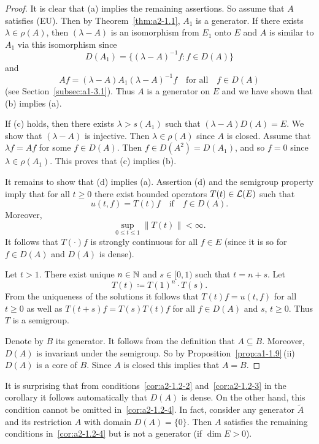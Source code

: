 \begin{proof}
It is clear that (a) implies the remaining assertions.
So assume that $A$ satisfies (EU).
Then by Theorem~\ref{thm:a2-1.1}, $A_{1}$ is a generator.
If there exists $\lambda \in \rho(A)$, then $(\lambda-A)$ is an isomorphism from $E_{1}$ onto $E$ and $A$ is similar to $A_{1}$ via this isomorphism since 
\[
D(A_{1}) = \{(\lambda-A)^{-1}f \colon f \in D(A)\}
\]
and 
%
\[
	Af = (\lambda-A)A_{1}(\lambda-A)^{-1}f
	\quad \text{for all} \quad f \in D(A)
\]
%
(see Section~\ref{subsec:a1-3.1}).
Thus $A$ is a generator on $E$ and we have shown that (b) implies (a).   

If (c)  holds, then there exists $\lambda > s(A_{1})$ such that $(\lambda-A)D(A) = E$.
We show that $(\lambda-A)$ is injective.
Then $\lambda \in \rho(A)$ since $A$ is closed.
Assume that $\lambda f = Af$ for some $f \in D(A)$.
Then $f \in D(A^{2}) = D(A_{1})$, and so $f = 0$ since $\lambda \in \rho(A_{1})$.
This proves that (c) implies (b).  

It remains to show that (d)  implies (a). 
Assertion (d) and the semigroup property imply that for all $ t \geq 0 $ there exist bounded operators $ T(t) \in \mathcal{L}(E) $ such that 
%
\[
	u(t,f) = T(t)f 
	\quad \text{if} \quad 
	f \in D(A) .
\]
%
Moreover, 
%
\[
	\sup_{0 \leq t \leq 1} \|T(t)\| < \infty .
\]
%
It follows that $ T(\cdot)f $ is strongly continuous for all $ f \in E $ (since it is so for $ f \in D(A) $ and $ D(A) $ is dense).

Let $ t > 1 $.
There exist unique $ n \in \mathbb{N} $ and $ s \in [0,1) $ such that $ t = n + s $.
Let 
%
\[
	T(t) \coloneq T(1)^{n} \cdot T(s) .
\]
%
From the uniqueness of the solutions it follows that $ T(t)f = u(t,f) $ for all $ t \geq 0 $ as well as $ T(t+s)f = T(s)T(t)f $ for all $ f \in D(A) $ and $ s$, $t \geq 0 $.
Thus $ T $ is a semigroup.

Denote by $ B $ its generator.
It follows from the definition that $ A \subseteq B $.
Moreover, $ D(A) $ is invariant under the semigroup.
So by Proposition~\ref{prop:a1-1.9}\,(ii) $ D(A) $ is a core of\/ $ B $.
Since $ A $ is closed this implies that $ A = B $.
\end{proof}
\begin{remark}\label{rem:a2-1.3}
It is surprising that from conditions~\ref{cor:a2-1.2-2}   and~\ref{cor:a2-1.2-3}   in the corollary it follows automatically that $ D(A) $ is dense.
On the other hand, this condition cannot be omitted in~\ref{cor:a2-1.2-4}.   
In fact, consider any generator $ \tilde{A} $ and its restriction $ A $ with domain $ D(A) = \{0\} $.
Then $ A $ satisfies the remaining conditions in~\ref{cor:a2-1.2-4} but is not a generator (if\/ $ \dim E > 0 $).
\end{remark}
